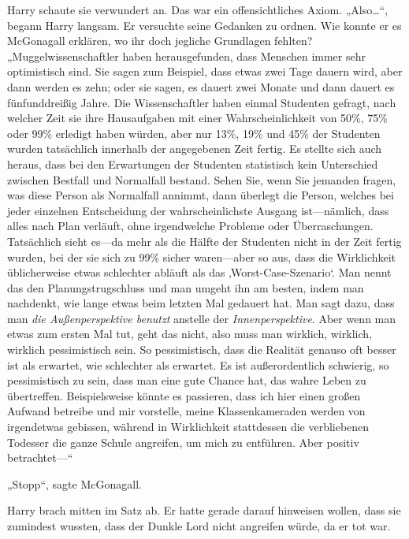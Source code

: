 Harry schaute sie verwundert an. Das war ein offensichtliches Axiom. „Also…“, begann Harry langsam. Er versuchte seine Gedanken zu ordnen. Wie konnte er es McGonagall erklären, wo ihr doch jegliche Grundlagen fehlten? „Muggelwissenschaftler haben herausgefunden, dass Menschen immer sehr optimistisch sind. Sie sagen zum Beispiel, dass etwas zwei Tage dauern wird, aber dann werden es zehn; oder sie sagen, es dauert zwei Monate und dann dauert es fünfunddreißig Jahre. Die Wissenschaftler haben einmal Studenten gefragt, nach welcher Zeit sie ihre Hausaufgaben mit einer Wahrscheinlichkeit von 50\%, 75\% oder 99\% erledigt haben würden, aber nur 13\%, 19\% und 45\% der Studenten wurden tatsächlich innerhalb der angegebenen Zeit fertig. Es stellte sich auch heraus, dass bei den Erwartungen der Studenten statistisch kein Unterschied zwischen Bestfall und Normalfall bestand. Sehen Sie, wenn Sie jemanden fragen, was diese Person als Normalfall annimmt, dann überlegt die Person, welches bei jeder einzelnen Entscheidung der wahrscheinlichste Ausgang ist—nämlich, dass alles nach Plan verläuft, ohne irgendwelche Probleme oder Überraschungen. Tatsächlich sieht es—da mehr als die Hälfte der Studenten nicht in der Zeit fertig wurden, bei der sie sich zu 99\% sicher waren—aber so aus, dass die Wirklichkeit üblicherweise etwas schlechter abläuft als das ‚Worst-Case-Szenario‘. Man nennt das den Planungstrugschluss und man umgeht ihn am besten, indem man nachdenkt, wie lange etwas beim letzten Mal gedauert hat. Man sagt dazu, dass man \emph{die Außenperspektive benutzt} anstelle der \emph{Innenperspektive}. Aber wenn man etwas zum ersten Mal tut, geht das nicht, also muss man wirklich, wirklich, wirklich pessimistisch sein. So pessimistisch, dass die Realität genauso oft besser ist als erwartet, wie schlechter als erwartet. Es ist außerordentlich schwierig, so pessimistisch zu sein, dass man eine gute Chance hat, das wahre Leben zu übertreffen. Beispielsweise könnte es passieren, dass ich hier einen großen Aufwand betreibe und mir vorstelle, meine Klassenkameraden werden von irgendetwas gebissen, während in Wirklichkeit stattdessen die verbliebenen Todesser die ganze Schule angreifen, um mich zu entführen. Aber positiv betrachtet—“

„Stopp“, sagte McGonagall.

Harry brach mitten im Satz ab. Er hatte gerade darauf hinweisen wollen, dass sie zumindest wussten, dass der Dunkle Lord nicht angreifen würde, da er tot war.

